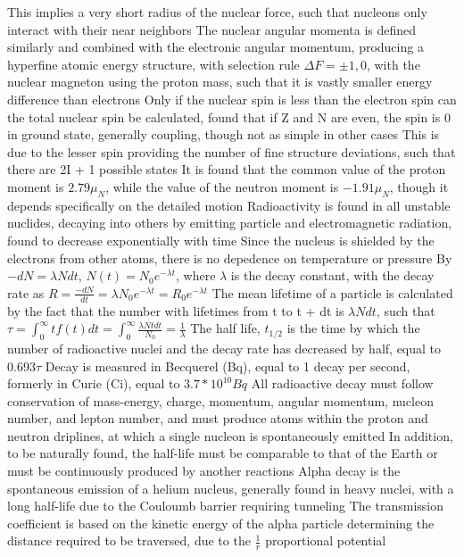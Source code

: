 \documentclass[11 pt, twoside]{article}
\newenvironment{outline*}
{
	\begin{outline}[enumerate]
	}
	{\end{outline}
}
\begin{document}
\begin{outline*}
		\3 This implies a very short radius of the nuclear force, such that nucleons only interact with their near neighbors
\1 The nuclear angular momenta is defined similarly and combined with the electronic angular momentum, producing a hyperfine atomic energy structure, with selection rule $\Delta F = \pm 1, 0$, with the nuclear magneton using the proton mass, such that it is vastly smaller energy difference than electrons
	\2 Only if the nuclear spin is less than the electron spin can the total nuclear spin be calculated, found that if Z and N are even, the spin is 0 in ground state, generally coupling, though not as simple in other cases
		\3 This is due to the lesser spin providing the number of fine structure deviations, such that there are 2I + 1 possible states
	\2 It is found that the common value of the proton moment is $2.79 \mu_N$, while the value of the neutron moment is $-1.91 \mu_N$, though it depends specifically on the detailed motion
\1 Radioactivity is found in all unstable nuclides, decaying into others by emitting particle and electromagnetic radiation, found to decrease exponentially with time
	\2 Since the nucleus is shielded by the electrons from other atoms, there is no depedence on temperature or pressure 
	\2 By $-dN = \lambda N dt$, $N(t) = N_0e^{-\lambda t}$, where $\lambda$ is the decay constant, with the decay rate as $R = \frac{-dN}{dt} = \lambda N_0e^{-\lambda t} = R_0e^{-\lambda t}$
		\3 The mean lifetime of a particle is calculated by the fact that the number with lifetimes from t to t + dt is $\lambda N dt$, such that $\tau = \int^{\infty}_0 t f(t)dt = \int^{\infty}_0 \frac{\lambda N t dt}{N_0} = \frac{1}{\lambda}$
		\3 The half life, $t_{1/2}$ is the time by which the number of radioactive nuclei and the decay rate has decreased by half, equal to 0.693$\tau$
	\2 Decay is measured in Becquerel (Bq), equal to 1 decay per second, formerly in Curie (Ci), equal to $3.7 * 10^10 Bq$
	\2 All radioactive decay must follow conservation of mass-energy, charge, momentum, angular momentum, nucleon number, and lepton number, and must produce atoms within the proton and neutron driplines, at which a single nucleon is spontaneously emitted
		\3 In addition, to be naturally found, the half-life must be comparable to that of the Earth or must be continuously produced by another reactions
	\2 Alpha decay is the spontaneous emission of a helium nucleus, generally found in heavy nuclei, with a long half-life due to the Couloumb barrier requiring tunneling
		\3 The transmission coefficient is based on the kinetic energy of the alpha particle determining the distance required to be traversed, due to the $\frac{1}{r}$ proportional potential

\end{outline*}
\end{document}
